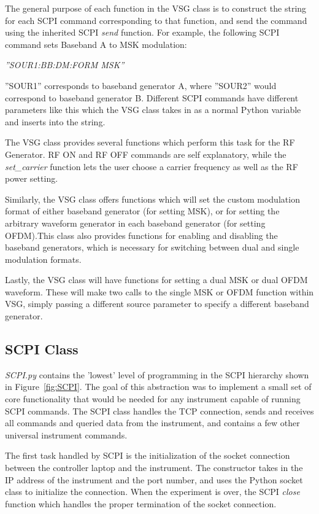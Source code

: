 The general purpose of each function in the VSG class is to construct the string for each SCPI command corresponding to that function, and send the command using the inherited SCPI \textit{send} function. For example, the following SCPI command sets Baseband A to MSK modulation:
{\centering\textit{''SOUR1:BB:DM:FORM	MSK''}\par}
''SOUR1'' corresponds to baseband generator A, where ''SOUR2'' would correspond to baseband generator B. Different SCPI commands have different parameters like this which the VSG class takes in as a normal Python variable and inserts into the string. 

The VSG class provides several functions which perform this task for the RF Generator. RF ON and RF OFF commands are self explanatory, while the \textit{set\_carrier} function lets the user choose a carrier frequency as well as the RF power setting.

Similarly, the VSG class offers functions which will set the custom modulation format of either baseband generator (for setting MSK), or for setting the arbitrary waveform generator in each baseband generator (for setting OFDM).This class also provides functions for enabling and disabling the baseband generators, which is necessary for switching between dual and single modulation formats. 

Lastly, the VSG class will have functions for setting a dual MSK or dual OFDM waveform. These will make two calls to the single MSK or OFDM function within VSG, simply passing a different source parameter to specify a different baseband generator.  
\subsection{SCPI Class}
\textit{SCPI.py} contains the 'lowest' level of programming in the SCPI hierarchy shown in Figure~\ref{fig:SCPI}. The goal of this abstraction was to implement a small set of core functionality that would be needed for any instrument capable of running SCPI commands. The SCPI class handles the TCP connection, sends and receives all commands and queried data from the instrument, and contains a few other universal instrument commands. 

The first task handled by SCPI is the initialization of the socket connection between the controller laptop and the instrument. The constructor takes in the IP address of the instrument and the port number, and uses the Python socket class to initialize the connection. When the experiment is over, the SCPI \textit{close} function which handles the proper termination of the socket connection. 

